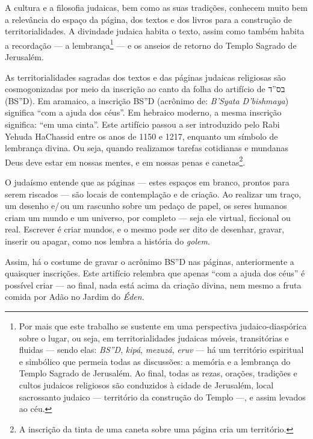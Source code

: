 \begin{center}\end{center}

\noindent{}A cultura e a filosofia judaicas, bem como as suas tradições, conhecem
muito bem a relevância do espaço da página, dos textos e dos livros para
a construção de territorialidades. A divindade judaica habita o texto,
assim como também habita a recordação --- a lembrança\footnote{Por mais
  que este trabalho se sustente em uma perspectiva judaico-diaspórica
  sobre o lugar, ou seja, em territorialidades judaicas móveis,
  transitórias e fluidas --- sendo elas: \emph{BS''D}, \emph{kipá},
  \emph{mezuzá}, \emph{eruv} --- há um território espiritual e simbólico
  que permeia todas as discussões: a memória e a lembrança do Templo
  Sagrado de Jerusalém. Ao final, todas as rezas, orações, tradições e
  cultos judaicos religiosos são conduzidos à cidade de Jerusalém, local
  sacrossanto judaico --- território da construção do Templo ---, e
  assim levados ao céu.} --- e os anseios de retorno do Templo Sagrado
de Jerusalém.

As territorialidades sagradas dos textos e das páginas judaicas
religiosas são cosmogonizadas por meio da inscrição ao canto da folha do
artifício de {בס''ד} (BS''D). Em aramaico, a inscrição BS''D
(acrônimo de: \emph{B'Syata D'bishmaya}) significa ``com a ajuda
dos céus''. Em hebraico moderno, a mesma inscrição significa: ``em uma
cinta''. Este artifício passou a ser introduzido pelo Rabi Yehuda
HaChassid entre os anos de 1150 e 1217, enquanto um símbolo de lembrança
divina. Ou seja, quando realizamos tarefas cotidianas e mundanas Deus
deve estar em nossas mentes, e em nossas penas e canetas\footnote{A
  inscrição da tinta de uma caneta sobre uma página cria um território.}.

O judaísmo entende que as páginas --- estes espaços em branco, prontos
para serem riscados --- são locais de contemplação e de criação. Ao
realizar um traço, um desenho e/\,ou um rascunho sobre um pedaço de papel,
os seres humanos criam um mundo e um universo, por completo --- seja ele
virtual, ficcional ou real. Escrever é criar mundos, e o mesmo pode ser
dito de desenhar, gravar, inserir ou apagar, como nos lembra a história
do \emph{golem}.

Assim, há o costume de gravar o acrônimo BS''D nas páginas,
anteriormente a quaisquer inscrições. Este artifício relembra que apenas
``com a ajuda dos céus'' é possível criar --- ao final, nada está acima
da criação divina, nem mesmo a fruta comida por Adão no Jardim do
\emph{Éden}.

